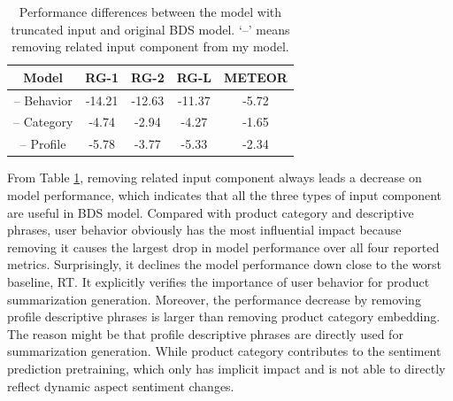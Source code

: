 \begin{table}%
	\centering
	\begin{tabular}{ccccc} 
		\toprule
		
		\textbf{Model}& \textbf{RG-1} & \textbf{RG-2} & \textbf{RG-L} & \textbf{METEOR}\\ \midrule  
		-- Behavior &-14.21 & -12.63&-11.37  & -5.72\\  
		-- Category&-4.74 & -2.94&-4.27 & -1.65 \\
		-- Profile &-5.78 & -3.77&-5.33& -2.34\\  
		\bottomrule
	\end{tabular} 
	\caption{Performance differences between the model with truncated input and original BDS model. `--' means removing related input component from my model.}
	\label{tab:c5_ablation} 
\end{table}
From Table \ref{tab:c5_ablation}, removing related input component always leads a decrease on model performance, which indicates that all the three types of input component are useful in BDS model. Compared with product category and descriptive phrases, user behavior obviously has the most influential impact because removing it causes the largest drop in model performance over all four reported metrics. Surprisingly, it declines the model performance down close to the worst baseline, RT. It explicitly verifies the importance of user behavior for product summarization generation. Moreover, the performance decrease by removing profile descriptive phrases is larger than removing product category embedding. The reason might be that profile descriptive phrases are directly used for summarization generation. While product category contributes to the sentiment prediction pretraining, which only has implicit impact and is not able to directly reflect dynamic aspect sentiment changes. 
 
